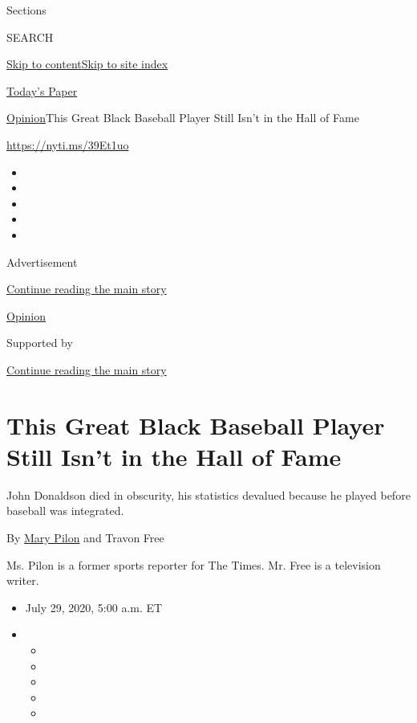 Sections

SEARCH

\protect\hyperlink{site-content}{Skip to
content}\protect\hyperlink{site-index}{Skip to site index}

\href{https://myaccount.nytimes3xbfgragh.onion/auth/login?response_type=cookie\&client_id=vi}{}

\href{https://www.nytimes3xbfgragh.onion/section/todayspaper}{Today's
Paper}

\href{/section/opinion}{Opinion}\textbar{}This Great Black Baseball
Player Still Isn't in the Hall of Fame

\url{https://nyti.ms/39Et1uo}

\begin{itemize}
\item
\item
\item
\item
\item
\end{itemize}

Advertisement

\protect\hyperlink{after-top}{Continue reading the main story}

\href{/section/opinion}{Opinion}

Supported by

\protect\hyperlink{after-sponsor}{Continue reading the main story}

\hypertarget{this-great-black-baseball-player-still-isnt-in-the-hall-of-fame}{%
\section{This Great Black Baseball Player Still Isn't in the Hall of
Fame}\label{this-great-black-baseball-player-still-isnt-in-the-hall-of-fame}}

John Donaldson died in obscurity, his statistics devalued because he
played before baseball was integrated.

By \href{https://www.nytimes3xbfgragh.onion/by/mary-pilon}{Mary Pilon}
and Travon Free

Ms. Pilon is a former sports reporter for The Times. Mr. Free is a
television writer.

\begin{itemize}
\item
  July 29, 2020, 5:00 a.m. ET
\item
  \begin{itemize}
  \item
  \item
  \item
  \item
  \item
  \end{itemize}
\end{itemize}

